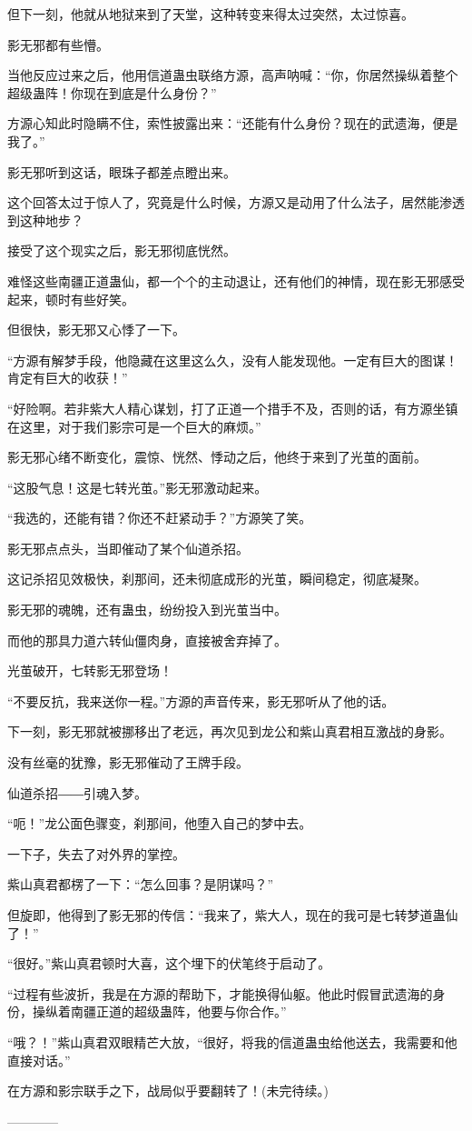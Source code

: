 \begin{this_body}
但下一刻，他就从地狱来到了天堂，这种转变来得太过突然，太过惊喜。

影无邪都有些懵。

当他反应过来之后，他用信道蛊虫联络方源，高声呐喊：“你，你居然操纵着整个超级蛊阵！你现在到底是什么身份？”

方源心知此时隐瞒不住，索性披露出来：“还能有什么身份？现在的武遗海，便是我了。”

影无邪听到这话，眼珠子都差点瞪出来。

这个回答太过于惊人了，究竟是什么时候，方源又是动用了什么法子，居然能渗透到这种地步？

接受了这个现实之后，影无邪彻底恍然。

难怪这些南疆正道蛊仙，都一个个的主动退让，还有他们的神情，现在影无邪感受起来，顿时有些好笑。

但很快，影无邪又心悸了一下。

“方源有解梦手段，他隐藏在这里这么久，没有人能发现他。一定有巨大的图谋！肯定有巨大的收获！”

“好险啊。若非紫大人精心谋划，打了正道一个措手不及，否则的话，有方源坐镇在这里，对于我们影宗可是一个巨大的麻烦。”

影无邪心绪不断变化，震惊、恍然、悸动之后，他终于来到了光茧的面前。

“这股气息！这是七转光茧。”影无邪激动起来。

“我选的，还能有错？你还不赶紧动手？”方源笑了笑。

影无邪点点头，当即催动了某个仙道杀招。

这记杀招见效极快，刹那间，还未彻底成形的光茧，瞬间稳定，彻底凝聚。

影无邪的魂魄，还有蛊虫，纷纷投入到光茧当中。

而他的那具力道六转仙僵肉身，直接被舍弃掉了。

光茧破开，七转影无邪登场！

“不要反抗，我来送你一程。”方源的声音传来，影无邪听从了他的话。

下一刻，影无邪就被挪移出了老远，再次见到龙公和紫山真君相互激战的身影。

没有丝毫的犹豫，影无邪催动了王牌手段。

仙道杀招――引魂入梦。

“呃！”龙公面色骤变，刹那间，他堕入自己的梦中去。

一下子，失去了对外界的掌控。

紫山真君都楞了一下：“怎么回事？是阴谋吗？”

但旋即，他得到了影无邪的传信：“我来了，紫大人，现在的我可是七转梦道蛊仙了！”

“很好。”紫山真君顿时大喜，这个埋下的伏笔终于启动了。

“过程有些波折，我是在方源的帮助下，才能换得仙躯。他此时假冒武遗海的身份，操纵着南疆正道的超级蛊阵，他要与你合作。”

“哦？！”紫山真君双眼精芒大放，“很好，将我的信道蛊虫给他送去，我需要和他直接对话。”

在方源和影宗联手之下，战局似乎要翻转了！(未完待续。)

------------

\end{this_body}

